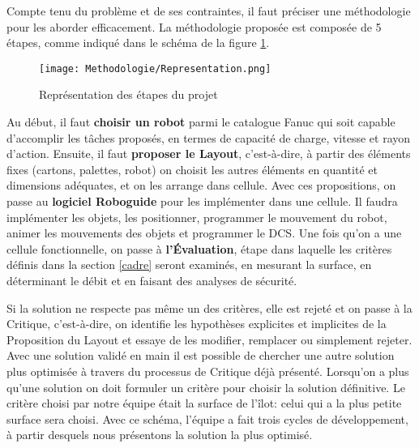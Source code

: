 
Compte tenu du problème et de ses contraintes, il faut préciser une méthodologie pour les aborder efficacement. La méthodologie proposée est composée de 5 étapes, comme indiqué dans le schéma de la figure \ref{fig:schema}. 

\begin{figure}[H]
	\begin{center}	
		\texttt{[image: Methodologie/Representation.png]}
		\caption{Représentation des étapes du projet}
		\label{fig:schema}
	\end{center}
\end{figure}


Au début, il faut \textbf{choisir un robot} parmi le catalogue Fanuc qui soit capable d’accomplir les tâches proposés, en termes de capacité de charge, vitesse et rayon d’action.
Ensuite, il faut \textbf{proposer le Layout}, c’est-à-dire, à partir des éléments fixes (cartons, palettes, robot) on choisit les autres éléments en quantité et dimensions adéquates, et on les arrange dans cellule.
Avec ces propositions, on passe au \textbf{logiciel Roboguide} pour les implémenter dans une cellule. Il faudra implémenter les objets, les positionner, programmer le mouvement du robot, animer les mouvements des objets et programmer le DCS. 
Une fois qu’on a une cellule fonctionnelle, on passe à \textbf{l’Évaluation}, étape dans laquelle les critères définis dans la section \ref{cadre} seront examinés, en mesurant  la surface, en déterminant le débit et en faisant des analyses de sécurité. \par \pagebreak Si la solution ne respecte pas même un des critères, elle est rejeté et on passe à la Critique, c’est-à-dire, on identifie les hypothèses explicites et implicites de la Proposition du Layout et essaye de les modifier, remplacer ou simplement rejeter.
Avec une solution validé en main il est possible de chercher une autre solution plus optimisée à travers du processus de Critique déjà présenté.
Lorsqu'on a plus qu'une solution on doit formuler un critère pour choisir la solution définitive. Le critère choisi par notre équipe était la surface de l’îlot: celui qui a la plus petite surface sera choisi.	
Avec ce schéma, l’équipe a fait trois cycles de développement, à partir desquels nous présentons la solution la plus optimisé. 